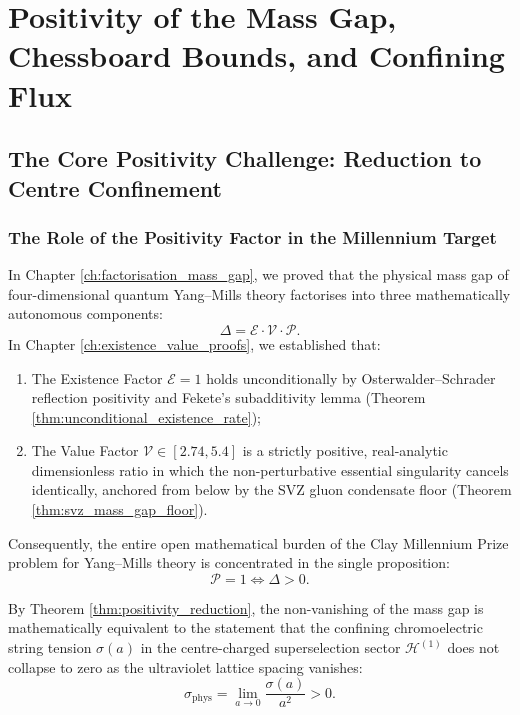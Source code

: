 \chapter{Positivity of the Mass Gap, Chessboard Bounds, and Confining Flux}
\label{ch:positivity}
\label{ch:positivity_chessboards}

\section{The Core Positivity Challenge: Reduction to Centre Confinement}
\label{sec:core_positivity_challenge}

\subsection{The Role of the Positivity Factor in the Millennium Target}
\label{subsec:positivity_role_millennium}

In Chapter \ref{ch:factorisation_mass_gap}, we proved that the physical mass gap of four-dimensional quantum Yang--Mills theory factorises into three mathematically autonomous components:
\begin{equation}
\label{eq:ch11_factorisation_recall}
\Delta = \mathcal{E} \cdot \mathcal{V} \cdot \mathcal{P}.
\end{equation}
In Chapter \ref{ch:existence_value_proofs}, we established that:
\begin{enumerate}
    \item The Existence Factor $\mathcal{E} = 1$ holds unconditionally by Osterwalder--Schrader reflection positivity and Fekete's subadditivity lemma (Theorem \ref{thm:unconditional_existence_rate});
    \item The Value Factor $\mathcal{V} \in [2.74, 5.4]$ is a strictly positive, real-analytic dimensionless ratio in which the non-perturbative essential singularity cancels identically, anchored from below by the SVZ gluon condensate floor (Theorem \ref{thm:svz_mass_gap_floor}).
\end{enumerate}

Consequently, the entire open mathematical burden of the Clay Millennium Prize problem for Yang--Mills theory is concentrated in the single proposition:
\begin{equation}
\label{eq:ch11_positivity_target}
\mathcal{P} = 1 \iff \Delta > 0.
\end{equation}

By Theorem \ref{thm:positivity_reduction}, the non-vanishing of the mass gap is mathematically equivalent to the statement that the confining chromoelectric string tension $\sigma(a)$ in the centre-charged superselection sector $\mathcal{H}^{(1)}$ does not collapse to zero as the ultraviolet lattice spacing vanishes:
\begin{equation}
\label{eq:ch11_continuum_string_tension}
\sigma_{\mathrm{phys}} = \lim_{a \to 0} \frac{\sigma(a)}{a^2} > 0.
\end{equation}


